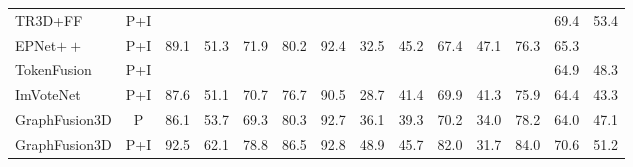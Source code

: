\documentclass[11pt]{article}
\begin{document}
\begin{table}[htbp]
{\begin{tabular}{@{}l | c |  llllllllll  ll@{}}
TR3D+FF   & P+I &     &     &     &     &     &      &      &      &      &      & 69.4 & 53.4 \\

EPNet\(++\)   &   P+I & 89.1 & 51.3 & 71.9 & 80.2 & 92.4 & 32.5 & 45.2 & 67.4 & 47.1 & 76.3 & 65.3 &   \\

TokenFusion   &  P+I &     &     &     &     &     &      &      &      &      &      & 64.9 & 48.3 \\

ImVoteNet  & P+I  & 87.6 & 51.1 & 70.7 & 76.7 & 90.5 & 28.7 & 41.4 & 69.9 & 41.3 & 75.9 & 64.4 & 43.3 \\


\hline
\rowcolor{gray!15}
GraphFusion3D  & P &  86.1   &  53.7   &  69.3   &   80.3  &  92.7   &  36.1    &  39.3    & 70.2     &   34.0   &  78.2   & 64.0 & 47.1 \\
\rowcolor{gray!15}
GraphFusion3D  & P+I  & 92.5 & 62.1 & 78.8 & 86.5 & 92.8 & 48.9 & 45.7 & 82.0 & 31.7 & 84.0 & 70.6 & 51.2 \\

\hline
\end{tabular}
}
\end{table}
\end{document}
